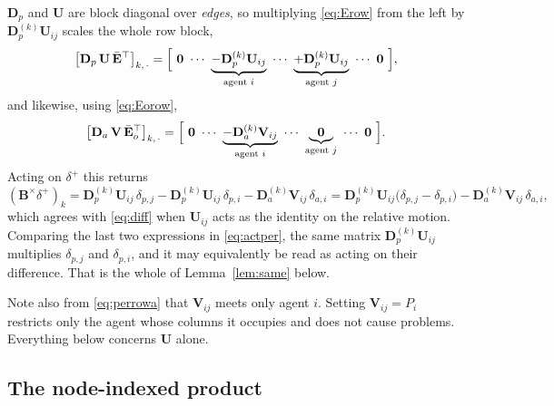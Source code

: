 \documentclass[11pt,a4paper]{article}
\theoremstyle{plain}
\theoremstyle{definition}
\newcommand{\Bper}{\mathbf{B}^{\times}}
\newcommand{\Ebar}{\bar{\mathbf{E}}}
\newcommand{\Ebaro}{\bar{\mathbf{E}}_o}
\newcommand{\Dp}{\mathbf{D}_p}
\newcommand{\Da}{\mathbf{D}_a}
\begin{document}
$\Dp$ and $\mathbf U$ are block diagonal over \emph{edges}, so multiplying
\eqref{eq:Erow} from the left by $\Dp^{(k)}\mathbf U_{ij}$ scales the whole row
block,
\begin{equation}\label{eq:perrow}
  \bigl[\Dp\,\mathbf U\,\Ebar^\top\bigr]_{k,\,\cdot}
  =\Bigl[\ \mathbf 0\ \cdots\
     \underbrace{-\Dp^{(k)}\mathbf U_{ij}}_{\text{agent }i}\ \cdots\
     \underbrace{+\Dp^{(k)}\mathbf U_{ij}}_{\text{agent }j}\ \cdots\
     \mathbf 0\ \Bigr],
\end{equation}
and likewise, using \eqref{eq:Eorow},
\begin{equation}\label{eq:perrowa}
  \bigl[\Da\,\mathbf V\,\Ebaro^\top\bigr]_{k,\,\cdot}
  =\Bigl[\ \mathbf 0\ \cdots\
     \underbrace{-\Da^{(k)}\mathbf V_{ij}}_{\text{agent }i}\ \cdots\
     \underbrace{\ \ \mathbf 0\ \ }_{\text{agent }j}\ \cdots\ \mathbf 0\ \Bigr].
\end{equation}
Acting on $\delta^+$ this returns
\begin{equation}\label{eq:actper}
  (\Bper\delta^+)_k
  =\Dp^{(k)}\mathbf U_{ij}\,\delta_{p,j}-\Dp^{(k)}\mathbf U_{ij}\,\delta_{p,i}
   -\Da^{(k)}\mathbf V_{ij}\,\delta_{a,i}
  =\Dp^{(k)}\mathbf U_{ij}\bigl(\delta_{p,j}-\delta_{p,i}\bigr)
   -\Da^{(k)}\mathbf V_{ij}\,\delta_{a,i},
\end{equation}
which agrees with \eqref{eq:diff} when $\mathbf U_{ij}$ acts as the identity on
the relative motion. Comparing the last two expressions in \eqref{eq:actper},
the same matrix $\Dp^{(k)}\mathbf U_{ij}$ multiplies $\delta_{p,j}$ and
$\delta_{p,i}$, and it may equivalently be read as acting on their difference.
That is the whole of Lemma~\ref{lem:same} below.

Note also from \eqref{eq:perrowa} that $\mathbf V_{ij}$ meets only agent $i$.
Setting $\mathbf V_{ij}=P_i$ restricts only the agent whose columns it occupies
and does not cause problems. Everything below concerns $\mathbf U$ alone.

\subsection*{The node-indexed product}
\end{document}
